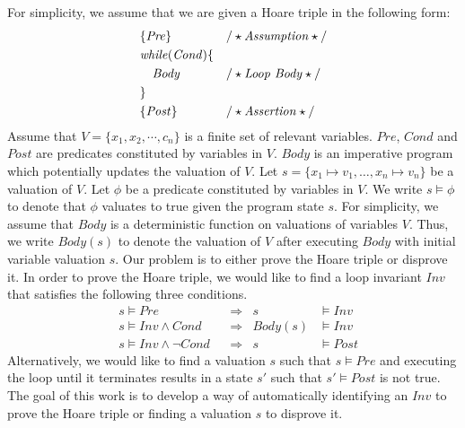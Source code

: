 For simplicity, we assume that we are given a Hoare triple in the following form: 
\begin{align*}
&\{\mathit{Pre}\} & & /\star\text{\emph{Assumption}}\star/ \\
&\mathit{while} (\mathit{Cond}) \{ && \\
&\quad \mathit{Body} & & /\star\text{\emph{Loop Body}}\star/ \\
&\} && \\
&\{\mathit{Post}\} & & /\star\text{\emph{Assertion}}\star/
\end{align*}
Assume that $V = \{x_1, x_2, \cdots, c_n\}$ is a finite set of relevant variables. $\mathit{Pre}$, $\mathit{Cond}$ and $\mathit{Post}$ are predicates constituted by variables in $V$. $\mathit{Body}$ is an imperative program which potentially updates the valuation of $V$.
Let $s = \{ x_1 \mapsto v_1, \ldots, x_n \mapsto v_n \}$ be a valuation of $V$. Let $\phi$ be a predicate constituted by variables in $V$. We write $s \models \phi$ to denote that $\phi$ valuates to true given the program state $s$. For simplicity, we assume that $\mathit{Body}$ is a deterministic function on valuations of variables $V$. Thus, we write $\mathit{Body}(s)$ to denote the valuation of $V$ after executing $\mathit{Body}$ with initial variable valuation $s$.
Our problem is to either prove the Hoare triple or disprove it. In order to prove the Hoare triple, we would like to find a loop invariant $\mathit{Inv}$ that satisfies the following three conditions.
\begin{align}
    &s \models \mathit{Pre}
        &&\Longrightarrow & s &\models \mathit{Inv} \label{inv:pre} \\
    &s \models \mathit{Inv} \wedge \mathit{Cond}
        &&\Longrightarrow & \mathit{Body}(s) &\models \mathit{Inv} \label{inv:loop} \\
    &s \models \mathit{Inv} \wedge \neg\mathit{Cond}
        &&\Longrightarrow & s &\models \mathit{Post} \label{inv:post}
\end{align}
Alternatively, we would like to find a valuation $s$ such that $s \models \mathit{Pre}$ and executing the loop until it terminates results in a state $s'$ such that $s' \models \mathit{Post}$ is not true. The goal of this work is to develop a way of automatically identifying an $\mathit{Inv}$ to prove the Hoare triple or finding a valuation $s$ to disprove it.

